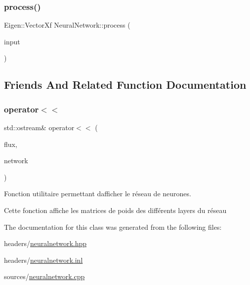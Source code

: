 \subsubsection{\texorpdfstring{process()}{process()}}
{\footnotesize\ttfamily Eigen\+::\+Vector\+Xf Neural\+Network\+::process (\begin{DoxyParamCaption}\item[{Eigen\+::\+Vector\+Xf}]{input }\end{DoxyParamCaption})}



\subsection{Friends And Related Function Documentation}
\mbox{\label{classNeuralNetwork_a0ecebf9a494437efb917804ed271e13f}} 
\subsubsection{\texorpdfstring{operator$<$$<$}{operator<<}}
{\footnotesize\ttfamily std\+::ostream\& operator$<$$<$ (\begin{DoxyParamCaption}\item[{std\+::ostream \&}]{flux,  }\item[{\hyperlink{classNeuralNetwork}{Neural\+Network}}]{network }\end{DoxyParamCaption})\hspace{0.3cm}{\ttfamily [friend]}}



Fonction utilitaire permettant d\textquotesingle{}afficher le réseau de neurones. 

Cette fonction affiche les matrices de poids des différents layers du réseau 

The documentation for this class was generated from the following files\+:\begin{DoxyCompactItemize}
\item 
headers/\hyperlink{neuralnetwork_8hpp}{neuralnetwork.\+hpp}\item 
headers/\hyperlink{neuralnetwork_8inl}{neuralnetwork.\+inl}\item 
sources/\hyperlink{neuralnetwork_8cpp}{neuralnetwork.\+cpp}\end{DoxyCompactItemize}
